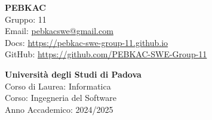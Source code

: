 \begin{minipage}[]{0.3\textwidth}
 
\end{minipage}
\hspace{0.05\textwidth}
\begin{minipage}[]{0.65\textwidth}
  {\Large \textbf{PEBKAC}} \\
  Gruppo: 11 \\
  Email: \href{mailto:pebkacswe@gmail.com}{pebkacswe@gmail.com} \\
  Docs: \href{https://pebkac-swe-group-11.github.io}{https://pebkac-swe-group-11.github.io} \\
  GitHub: \href{https://github.com/PEBKAC-SWE-Group-11}{https://github.com/PEBKAC-SWE-Group-11} \\
  
\end{minipage}

\bigskip

\begin{minipage}[]{0.3\textwidth}
 
\end{minipage}
\hspace{0.05\textwidth}
\begin{minipage}[]{0.65\textwidth}
  \textcolor{unipd}{
    \textbf{Università degli Studi di Padova} \\
    Corso di Laurea: Informatica \\
    Corso: Ingegneria del Software \\
    Anno Accademico: 2024/2025
  }
\end{minipage}

\bigskip
\bigskip
\bigskip